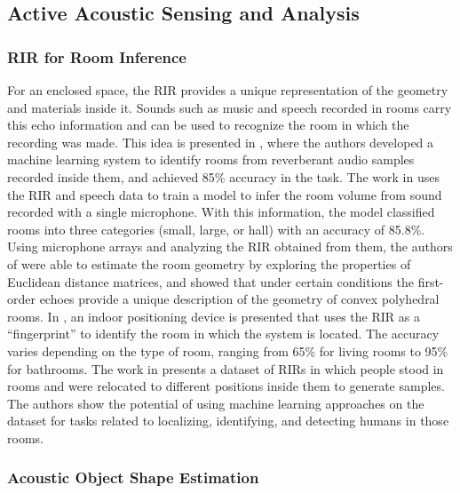 \subsection{Active Acoustic Sensing and Analysis}

\subsubsection{RIR for Room Inference}

For an enclosed space, the RIR provides a unique representation of the geometry and materials inside it. Sounds such as music and speech recorded in rooms carry this echo information and can be used to recognize the room in which the recording was made. This idea is presented in \cite{RIR05}, where the authors developed a machine learning system to identify rooms from reverberant audio samples recorded inside them, and achieved 85\% accuracy in the task. The work in \cite{RIR06} uses the RIR and speech data to train a model to infer the room volume from sound recorded with a single microphone. With this information, the model classified rooms into three categories (small, large, or hall) with an accuracy of 85.8\%. Using microphone arrays and analyzing the RIR obtained from them, the authors of \cite{RIR07} were able to estimate the room geometry by exploring the properties of Euclidean distance matrices, and showed that under certain conditions the first-order echoes provide a unique description of the geometry of convex polyhedral rooms. In \cite{RIR08}, an indoor positioning device is presented that uses the RIR as a ``fingerprint'' to identify the room in which the system is located. The accuracy varies depending on the type of room, ranging from 65\% for living rooms to 95\% for bathrooms. The work in \cite{RIR09} presents a dataset of RIRs in which people stood in rooms and were relocated to different positions inside them to generate samples. The authors show the potential of using machine learning approaches on the dataset for tasks related to localizing, identifying, and detecting humans in those rooms.

\subsubsection{Acoustic Object Shape Estimation}

